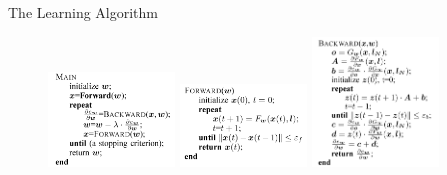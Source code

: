 \documentclass[10pt,aspectratio=169]{beamer}
\begin{document}
\begin{frame}[allowframebreaks]{The Learning Algorithm}
\framebreak
\begin{figure}
    \centering
    \includegraphics[width=0.3\textwidth]{pic/main.png}
    \includegraphics[width=0.3\textwidth]{pic/forward.png}
    \includegraphics[width=0.3\textwidth]{pic/backward.png}        
\end{figure}

\end{frame}
\end{document}
